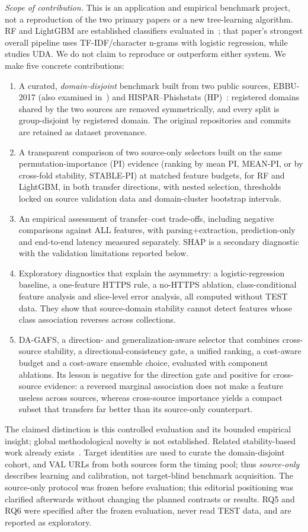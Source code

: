 \textit{Scope of contribution.} This is an application and empirical benchmark project, not a reproduction of the two primary papers or a new tree-learning algorithm. RF and LightGBM are established classifiers evaluated in~\cite{sanchez2022}; that paper's strongest overall pipeline uses TF-IDF/character n-grams with logistic regression, while~\cite{rashid2024} studies UDA. We do not claim to reproduce or outperform either system. We make five concrete contributions:
\begin{enumerate}
\item A curated, \emph{domain-disjoint} benchmark built from two public sources, EBBU-2017 (also examined in~\cite{sanchez2022}) and HISPAR--Phishstats (HP)~\cite{rashid2024}: registered domains shared by the two sources are removed symmetrically, and every split is group-disjoint by registered domain. The original repositories and commits are retained as dataset provenance.
\item A transparent comparison of two source-only selectors built on the same permutation-importance (PI) evidence (ranking by mean PI, MEAN-PI, or by cross-fold stability, STABLE-PI) at matched feature budgets, for RF and LightGBM, in both transfer directions, with nested selection, thresholds locked on source validation data and domain-cluster bootstrap intervals.
\item An empirical assessment of transfer--cost trade-offs, including negative comparisons against ALL features, with parsing+extraction, prediction-only and end-to-end latency measured separately. SHAP is a secondary diagnostic with the validation limitations reported below.
\item Exploratory diagnostics that explain the asymmetry: a logistic-regression baseline, a one-feature HTTPS rule, a no-HTTPS ablation, class-conditional feature analysis and slice-level error analysis, all computed without TEST data. They show that source-domain stability cannot detect features whose class association reverses across collections.
\item DA-GAFS, a direction- and generalization-aware selector that combines cross-source stability, a directional-consistency gate, a unified ranking, a cost-aware budget and a cost-aware ensemble choice, evaluated with component ablations. Its lesson is negative for the direction gate and positive for cross-source evidence: a reversed marginal association does not make a feature useless across sources, whereas cross-source importance yields a compact subset that transfers far better than its source-only counterpart.
\end{enumerate}
The claimed distinction is this controlled evaluation and its bounded empirical insight; global methodological novelty is not established. Related stability-based work already exists~\cite{kanon2026,misiek2026}. Target identities are used to curate the domain-disjoint cohort, and VAL URLs from both sources form the timing pool; thus \emph{source-only} describes learning and calibration, not target-blind benchmark acquisition. The source-only protocol was frozen before evaluation; this editorial positioning was clarified afterwards without changing the planned contrasts or results. RQ5 and RQ6 were specified after the frozen evaluation, never read TEST data, and are reported as exploratory.
